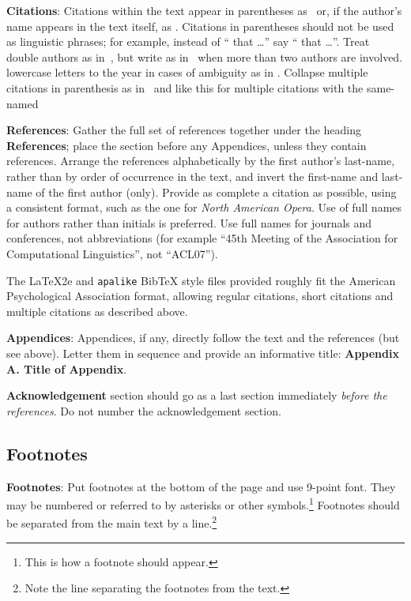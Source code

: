 \documentclass[]{article}
\begin{document}
{\bf Citations}: Citations within the text appear in parentheses
as~\citep{Smith} or, if the author's name appears in the text itself,
as \cite{Smith}. Citations in parentheses should not be used as
linguistic phrases; for example, instead of ``\citep{Smith}
 that \ldots'' say ``\cite{Smith} 
that \ldots''.  Treat double authors as in~\citep{DD15}, but write as
in~\citep{PDC} when more than two authors are involved.
 lowercase letters to the year in cases of ambiguity
as in \citep{JonesFirst}.  Collapse multiple citations in parenthesis
as in~\citep{Smith,JonesFirst} and like this for multiple citations
with the same-named 
\citep{Smith,SmithConc,JonesFirst,JonesSecond}

\textbf{References}: Gather the full set of references together under the
heading {\bf References}; place the section before any Appendices, unless they
contain references. Arrange the references alphabetically by the first
author's last-name, rather than by order of occurrence in the text, and invert
the first-name and last-name of the first author (only). Provide as complete
a citation as possible, using a consistent format, such as the one for {\em
North American Opera\/}.  Use of full names for
authors rather than initials is preferred.  Use full names for journals and
conferences, not abbreviations (for example ``45th Meeting of the Association
for Computational Linguistics'', not ``ACL07'').

The \LaTeX2e{} and \texttt{apalike} Bib\TeX{} style files provided roughly fit the
American Psychological Association format, allowing regular citations,
short citations and multiple citations as described above.

{\bf Appendices}: Appendices, if any, directly follow the text and the
references (but see above).  Letter them in sequence and provide an
informative title: {\bf Appendix A. Title of Appendix}.

\textbf{Acknowledgement} section should go as a last section immediately
\textit{before the references}.  Do not number the acknowledgement section.

\subsection{Footnotes}

{\bf Footnotes}: Put footnotes at the bottom of the page and use
9-point font. They may be numbered or referred to by asterisks or
other symbols.\footnote{This is how a footnote should appear.}
Footnotes should be separated from the main text by a
line.\footnote{Note the line separating the footnotes from the text.}
\end{document}
